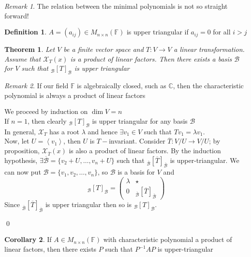 \documentclass[11pt, a4paper]{report}
\makeatletter
\numberwithin{equation}{section}
\renewcommand{\chi}{\mathcal{X}}
\newcommand{\C}{\mathbb{C}}
\newcommand{\F}{\mathbb{F}}
\newcommand{\spn}[1]{\left\langle #1 \right\rangle}
\newcommand{\pmx}[1]{\begin{pmatrix}#1\end{pmatrix}}
\numberwithin{equation}{subsection}
\theoremstyle{plain}
\newtheorem{thm}{Theorem}[chapter] %
\theoremstyle{definition}
\newtheorem{defn}{Definition}[chapter]
\newtheorem{cor}[thm]{Corollary}
\theoremstyle{remark}
\newtheorem*{rem}{Remark}
\newtheorem*{prf}{Proof}
\renewenvironment{prf}[1][\proofname]{\par
  \vspace{-\topsep}%
  \normalfont
  \topsep0pt \partopsep0pt %
  \trivlist
  \item[\hskip\labelsep
        \itshape
    #1\@addpunct{.}]\ignorespaces
}{%
  \popQED\endtrivlist\@endpefalse
  \addvspace{6pt plus 6pt} %
}
\newcommand{\pr}[1]{\begin{adjustwidth}{1cm}{} \begin{prf} #1 \end{prf} \end{adjustwidth}}
\makeatother
\begin{document}
\begin{rem} The relation between the minimal polynomials is not so straight forward! \end{rem}

\begin{defn} $A = (a_{ij}) \in M_{n \times n}(\F)$ is upper triangular if $a_{ij} = 0$ for all $i > j$ \end{defn}

\begin{thm} Let $V$ be a finite vector space and $T: V \to V$ a linear transformation. Assume that $\chi_T(x)$ is a product of linear factors. Then there exists a basis $\mathcal{B}$ for $V$ such that $_\mathcal{B}[T]_\mathcal{B}$ is upper triangular
\end{thm}

\begin{rem} If our field $\F$ is algebraically closed, such as $\C$, then the characteristic polynomial is always a product of linear factors \end{rem}

\pr{
We proceed by induction on $\dim V = n$\\
If $n = 1$, then clearly $_\mathcal{B}[T]_\mathcal{B}$ is upper triangular for any basis $\mathcal{B}$\\
In general, $\chi_T$ has a root $\lambda$ and hence $\exists v_1 \in V$ such that $Tv_1 = \lambda v_1$.\\
Now, let $U = \spn{v_1}$, then $U$ is $T-$invariant. Consider $\overline{T} : V/U \to V/U$; by proposition, $\chi_{\overline{T}}(x)$ is also a product of linear factors. By the induction hypothesis, $\exists \overline{\mathcal{B}} = \{ v_2 + U, \ldots, v_n + U \}$ such that $_{\overline{\mathcal{B}}}[\overline{T}]_{\overline{\mathcal{B}}}$ is upper-triangular. We can now put $\mathcal{B} = \{ v_1, v_2, \ldots, v_n \}$, so $\mathcal{B}$ is a basis for $V$ and 
$$_\mathcal{B}[T]_\mathcal{B} = \pmx{ \lambda & \star \\ 0 & _{\overline{\mathcal{B}}}[\overline{T}]_{\overline{\mathcal{B}}}}$$
Since $_{\overline{\mathcal{B}}}[\overline{T}]_{\overline{\mathcal{B}}}$ is upper triangular then so is $_\mathcal{B}[T]_\mathcal{B}$.
}\qed

\begin{cor} If $A \in M_{n \times n}(\F)$ with characteristic polynomial a product of linear factors, then there exists $P$ such that $P^{-1}AP$ is upper-triangular \end{cor}

\newpage
\end{document}

